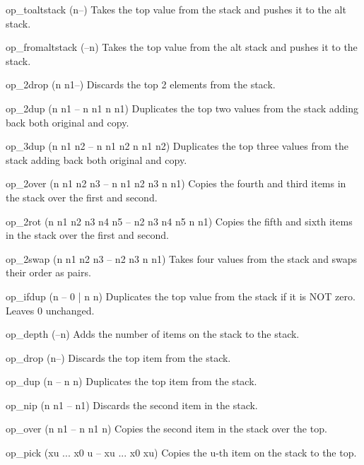 \documentclass[a4paper, 11pt, openany]{book}
\begin{document}
\begin{forthbox}
  op_toaltstack    (n--)
                   Takes the top value from the stack and pushes
                   it to the alt stack.

  op_fromaltstack  (--n)
                   Takes the top value from the alt stack and
                   pushes it to the stack.

  op_2drop         (n n1--)
                   Discards the top 2 elements from the stack.

  op_2dup          (n n1 -- n n1 n n1)
                   Duplicates the top two values from the stack
                   adding back both original and copy.

  op_3dup          (n n1 n2 -- n n1 n2 n n1 n2)
                   Duplicates the top three values from the stack
                   adding back both original and copy.

  op_2over         (n n1 n2 n3 -- n n1 n2 n3 n n1)
                   Copies the fourth and third items in the stack
                   over the first and second.

  op_2rot          (n n1 n2 n3 n4 n5 -- n2 n3 n4 n5 n n1)
                   Copies the fifth and sixth items in the stack
                   over the first and second.

  op_2swap         (n n1 n2 n3 -- n2 n3 n n1)
                   Takes four values from the stack and swaps
                   their order as pairs.

  op_ifdup         (n -- 0 | n n)
                   Duplicates the top value from the stack if it
                   is NOT zero. Leaves 0 unchanged.

  op_depth         (--n)
                   Adds the number of items on the stack to the
                   stack.

  op_drop          (n--)
                   Discards the top item from the stack.

  op_dup           (n -- n n)
                   Duplicates the top item from the stack.

  op_nip           (n n1 -- n1)
                   Discards the second item in the stack.

  op_over          (n n1 -- n n1 n)
                   Copies the second item in the stack over the
                   top.

  op_pick          (xu ... x0 u -- xu ... x0 xu)
                   Copies the u-th item on the stack to the top.


\end{forthbox}
\end{document}
